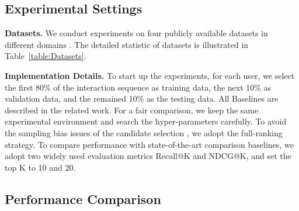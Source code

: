 \documentclass[runningheads]{llncs}
\begin{document}
\subsection{Experimental Settings}
\vspace{-5pt}
\textbf{Datasets.}
We conduct experiments on four publicly available datasets in different domains \cite{amazon}. The detailed statistic of datasets is illustrated in Table~\ref{table:Datasets}.

\vspace{-20pt}
\begin{table*}

	\caption{The statistics of datasets.}\vspace{-5pt}
	\centering
	\label{table:Datasets}
\end{table*}



\vspace{-20pt}
\hspace{-15pt}\textbf{Implementation Details.}
To start up the experiments, for each user, we select the first 80\% of the interaction sequence as training data, the next 10\% as validation data, and the remained 10\% as the testing data. All Baselines are described in the related work. For a fair comparison, we keep the same experimental environment and search the hyper-parameters carefully. To avoid the sampling bias issues of the candidate selection \cite{fr}, we adopt the full-ranking strategy. To compare performance with state-of-the-art comparison baselines, we adopt two widely used evaluation metrics Recall@K and NDCG@K, and set the top K to 10 and 20. 

\vspace{-15pt}

\subsection{Performance Comparison}
\vspace{-5pt}
\end{document}

